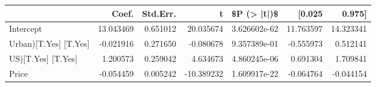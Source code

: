 \begin{tabular}{lrrrrrr}
\toprule
{} &      Coef. &  Std.Err. &          t &   \$P (> |t|)\$ &     [0.025 &     0.975] \\
\midrule
Intercept             &  13.043469 &  0.651012 &  20.035674 &  3.626602e-62 &  11.763597 &  14.323341 \\
Urban)[T.Yes] [T.Yes] &  -0.021916 &  0.271650 &  -0.080678 &  9.357389e-01 &  -0.555973 &   0.512141 \\
US)[T.Yes] [T.Yes]    &   1.200573 &  0.259042 &   4.634673 &  4.860245e-06 &   0.691304 &   1.709841 \\
Price                 &  -0.054459 &  0.005242 & -10.389232 &  1.609917e-22 &  -0.064764 &  -0.044154 \\
\bottomrule
\end{tabular}
